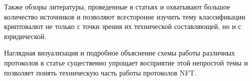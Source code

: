 \documentclass[14pt, a4paper]{extarticle}
\begin{document}
Также обзоры литературы, проведенные в статьях \cite{turcomat} и \cite{wu2018classification} охватывают большое количество источников и позволяют всесторонне изучить тему классификации криптовалют не только с точки зрения их технической составляющей, но и с юридической.

Наглядная визуализация и подробное объяснение схемы работы различных протоколов в статье \cite{wu2018classification} существенно упрощает восприятие этой непростой темы и позволяет понять техническую часть работы протоколов NFT.

\printbibliography
\end{document}
